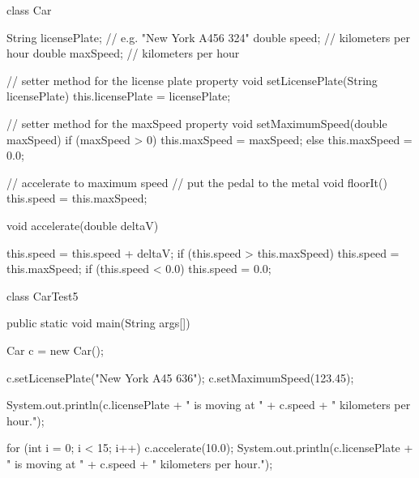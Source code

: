 class Car {

  String licensePlate; // e.g. "New York A456 324"
  double speed;        // kilometers per hour
  double maxSpeed;     // kilometers per hour
  
  // setter method for the license plate property
  void setLicensePlate(String licensePlate) {
    this.licensePlate = licensePlate;
  }

  // setter method for the maxSpeed property
  void setMaximumSpeed(double maxSpeed) {
    if (maxSpeed > 0) this.maxSpeed = maxSpeed;
    else this.maxSpeed = 0.0;
  }

  // accelerate to maximum speed
  // put the pedal to the metal
  void floorIt() {
    this.speed = this.maxSpeed;  
  }
  
  void accelerate(double deltaV) {

     this.speed = this.speed + deltaV;
     if (this.speed > this.maxSpeed) {
       this.speed = this.maxSpeed; 
     }
     if (this.speed <  0.0) {
       this.speed = 0.0; 
     }     
     
  }
  
}


class CarTest5 {

  public static void main(String args[]) {
    
    Car c = new Car();
    
    c.setLicensePlate("New York A45 636");
    c.setMaximumSpeed(123.45);
    
    System.out.println(c.licensePlate + " is moving at " + c.speed + 
     " kilometers per hour.");

    for (int i = 0; i < 15; i++) {
      c.accelerate(10.0);     
      System.out.println(c.licensePlate + " is moving at " + c.speed + 
       " kilometers per hour.");
    }

  }
    
}